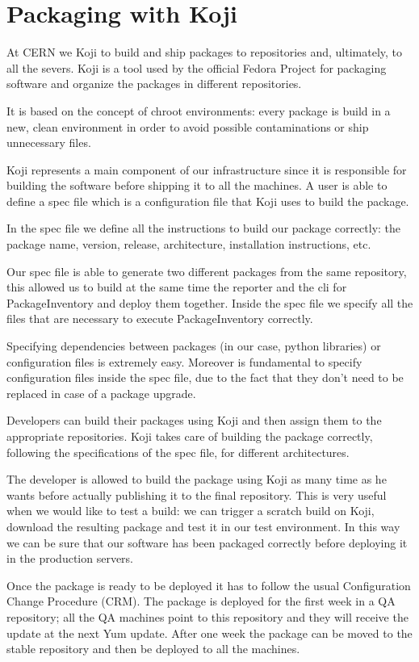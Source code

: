 \section{Packaging with Koji}

At CERN we Koji to build and ship packages to repositories and,
ultimately, to all the severs. Koji is a tool used by the official Fedora
Project \cite{FedoraProject} for packaging software and organize the
packages in different repositories.

It is based on the concept of chroot environments: every package is build
in a new, clean environment in order to avoid possible contaminations or
ship unnecessary files.

Koji represents a main component of our infrastructure since it is
responsible for building the software before shipping it to all the
machines. A user is able to define a spec file which is a configuration
file that Koji uses to build the package.

In the spec file we define all the instructions to build our package
correctly: the package name, version, release, architecture, installation
instructions, etc.

Our spec file is able to generate two different packages from the same
repository, this allowed us to build at the same time the reporter and the
cli for PackageInventory and deploy them together. Inside the spec file we
specify all the files that are necessary to execute PackageInventory
correctly.

Specifying dependencies between packages (in our case, python libraries)
or configuration files is extremely easy. Moreover is fundamental to
specify configuration files inside the spec file, due to the fact that
they don't need to be replaced in case of a package upgrade.

Developers can build their packages using Koji and then assign them to the
appropriate repositories. Koji takes care of building the package
correctly, following the specifications of the spec file, for different
architectures.

The developer is allowed to build the package using Koji as many time as
he wants before actually publishing it to the final repository. This is
very useful when we would like to test a build: we can trigger a scratch
build on Koji, download the resulting package and test it in our test
environment. In this way we can be sure that our software has been
packaged correctly before deploying it in the production servers.

Once the package is ready to be deployed it has to follow the usual
Configuration Change Procedure (CRM). The package is deployed for the
first week in a QA repository; all the QA machines point to this
repository and they will receive the update at the next Yum update. After
one week the package can be moved to the stable repository and then be
deployed to all the machines.


